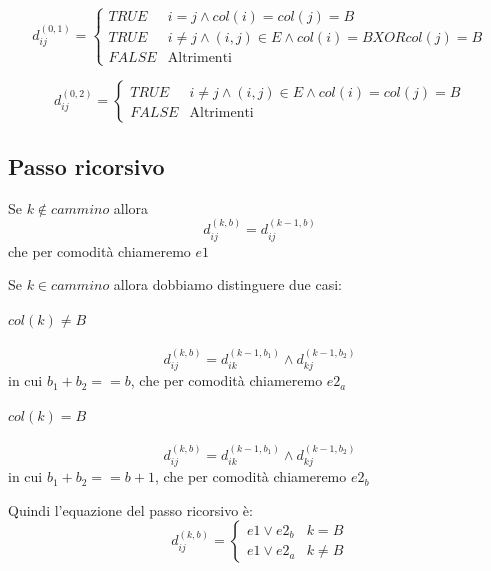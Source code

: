 \documentclass[12pt, a4paper, openany]{book}
\begin{document}
\begin{equation*}
	d_{ij}^{(0,1)} = \begin{cases}
		TRUE  & i=j\land col(i)= col(j) = B                          \\
		TRUE  & i\neq j\land (i,j)\in E \land col(i)= B XOR col(j)=B \\
		FALSE & \text{Altrimenti}
	\end{cases}
\end{equation*}

\begin{equation*}
	d_{ij}^{(0,2)} = \begin{cases}
		TRUE  & i\neq j\land (i,j)\in E \land col(i)= col(j)= B \\
		FALSE & \text{Altrimenti}
	\end{cases}
\end{equation*}

\subsection*{Passo ricorsivo}
Se $k \notin cammino$ allora
\begin{equation*}
	d_{ij}^{(k,b)} = d_{ij}^{(k-1,b)}
\end{equation*}
che per comodità chiameremo $e1$

Se $k \in cammino$ allora dobbiamo distinguere due casi:
\paragraph{$col(k) \neq B$}
\begin{equation*}
	d_{ij}^{(k,b)} = d_{ik}^{(k-1,b_1)} \land d_{kj}^{(k-1,b_2)}
\end{equation*}
in cui $b_1 + b_2 == b$, che per comodità chiameremo $e2_a$
\paragraph{$col(k) = B$}
\begin{equation*}
	d_{ij}^{(k,b)} = d_{ik}^{(k-1,b_1)} \land d_{kj}^{(k-1,b_2)}
\end{equation*}
in cui $b_1 + b_2 == b+1$, che per comodità chiameremo $e2_b$

Quindi l'equazione del passo ricorsivo è:
\begin{equation*}
	d^{(k,b)}_{ij} = \begin{cases}
		e1 \lor e2_b & k=B     \\
		e1 \lor e2_a & k\neq B
	\end{cases}
\end{equation*}
\end{document}
